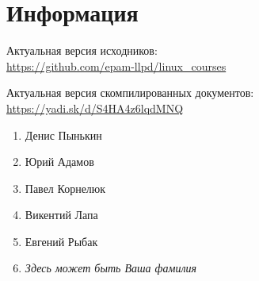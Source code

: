 \part*{Информация}

Актуальная версия исходников:\\
\url{https://github.com/epam-llpd/linux_courses}

Актуальная версия скомпилированных документов:\\
\url{https://yadi.sk/d/S4HA4z6lqdMNQ}

\bigskip

\begin{enumerate}
		\item Денис Пынькин
		\item Юрий Адамов
		\item Павел Корнелюк
		\item Викентий Лапа
		\item Евгений Рыбак
		\item {\it Здесь может быть Ваша фамилия}
\end{enumerate}


